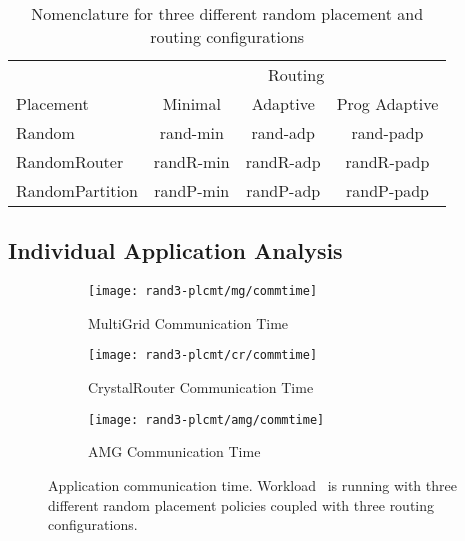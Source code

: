 \begin{table}[ht]
\begin{center}
\caption{Nomenclature for three different random placement and routing configurations} 
\label{tab: placement routing configs}
\begin{tabular}{l c c c }
\toprule %
\toprule
&\multicolumn{3}{c}{Routing } \\ 
\cmidrule(l){2-4}
Placement  & Minimal & Adaptive & Prog Adaptive\\ %
\midrule
Random &   rand-min  &   rand-adp   &  rand-padp   \\ 
\midrule %
RandomRouter &   randR-min  &   randR-adp   &  randR-padp   \\
\midrule
RandomPartition &   randP-min  &   randP-adp   &  randP-padp   \\ 
\midrule %
\bottomrule %
\end{tabular}
\end{center}
\end{table}



\subsection{Individual Application Analysis}
\label{sec:rand3-plcmnt-app-study}

\begin{figure*}[t!]
    \centering
    \begin{subfigure}[t]{0.32\textwidth}
        \centering
        \texttt{[image: rand3-plcmt/mg/commtime]}
        \caption{MultiGrid Communication Time}
        \label{fig:rand3-plcmt-mg-commtime}
    \end{subfigure}\hfill
    \begin{subfigure}[t]{0.32\textwidth}
        \centering
        \texttt{[image: rand3-plcmt/cr/commtime]}
        \caption{CrystalRouter Communication Time}
        \label{fig:rand3-plcmt-cr-commtime}
    \end{subfigure}\hfill
    \begin{subfigure}[t]{0.32\textwidth}
        \centering
        \texttt{[image: rand3-plcmt/amg/commtime]}
        \caption{AMG Communication Time}
        \label{fig:rand3-plcmt-amg-commtime}
    \end{subfigure}
   \caption{Application communication time. Workload~ is running with three different random placement policies coupled with three routing configurations.}
   \label{fig:rand3-plcmt-apps-commtime}
\end{figure*}

